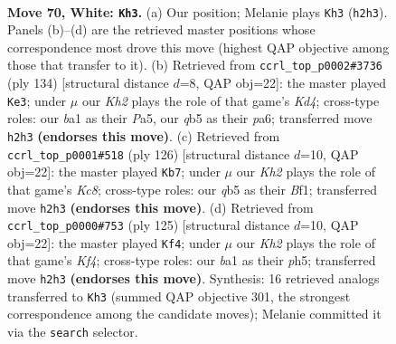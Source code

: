 \documentclass[11pt]{article}
\begin{document}
\clearpage

\begin{figure}[p]\centering
\begin{subfigure}{0.46\textwidth}\centering
\resizebox{\linewidth}{!}{%
\newchessgame
\chessboard[
  setfen={8/3Pkp2/8/1q6/8/8/7K/b7 w - - 3 70},
  showmover=false,
  pgfstyle=straightmove, color=movearrow, markmove={h2-h3}
]}
\caption{}
\end{subfigure}\hfill
\begin{subfigure}{0.46\textwidth}\centering
\resizebox{\linewidth}{!}{%
\newchessgame
\chessboard[
  setfen={8/8/p7/P7/3K1Pkp/8/8/8 w - - 1 68},
  showmover=false,
  pgfstyle=straightmove, color=movearrow, markmove={d4-e3}
]}
\caption{}
\end{subfigure}
\\[4pt]
\begin{subfigure}{0.46\textwidth}\centering
\resizebox{\linewidth}{!}{%
\newchessgame
\chessboard[
  setfen={2K5/8/8/1Pk5/3p4/8/8/4bB2 w - - 9 64},
  showmover=false,
  pgfstyle=straightmove, color=movearrow, markmove={c8-b7}
]}
\caption{}
\end{subfigure}\hfill
\begin{subfigure}{0.46\textwidth}\centering
\resizebox{\linewidth}{!}{%
\newchessgame
\chessboard[
  setfen={8/8/8/5k1P/2PKp3/8/8/8 b - - 1 63},
  showmover=false,
  pgfstyle=straightmove, color=movearrow, markmove={f5-f4}
]}
\caption{}
\end{subfigure}
\caption{\textbf{Move 70, White: \texttt{Kh3}.} (a) Our position; Melanie plays \texttt{Kh3} (\texttt{h2h3}). Panels (b)--(d) are the retrieved master positions whose correspondence most drove this move (highest QAP objective among those that transfer to it). (b) Retrieved from \texttt{ccrl\_top\_p0002\#3736} (ply 134) [structural distance $d$=8, QAP obj=22]: the master played \texttt{Ke3}; under $\mu$ our \emph{Kh2} plays the role of that game's \emph{Kd4}; cross-type roles: our \emph{b}a1 as their \emph{P}a5, our \emph{q}b5 as their \emph{p}a6; transferred move \texttt{h2h3} \textbf{(endorses this move)}. (c) Retrieved from \texttt{ccrl\_top\_p0001\#518} (ply 126) [structural distance $d$=10, QAP obj=22]: the master played \texttt{Kb7}; under $\mu$ our \emph{Kh2} plays the role of that game's \emph{Kc8}; cross-type roles: our \emph{q}b5 as their \emph{B}f1; transferred move \texttt{h2h3} \textbf{(endorses this move)}. (d) Retrieved from \texttt{ccrl\_top\_p0000\#753} (ply 125) [structural distance $d$=10, QAP obj=22]: the master played \texttt{Kf4}; under $\mu$ our \emph{Kh2} plays the role of that game's \emph{Kf4}; cross-type roles: our \emph{b}a1 as their \emph{p}h5; transferred move \texttt{h2h3} \textbf{(endorses this move)}. Synthesis: 16 retrieved analogs transferred to \texttt{Kh3} (summed QAP objective 301, the strongest correspondence among the candidate moves); Melanie committed it via the \texttt{search} selector.}
\label{fig:thought-m138}
\end{figure}
\end{document}
